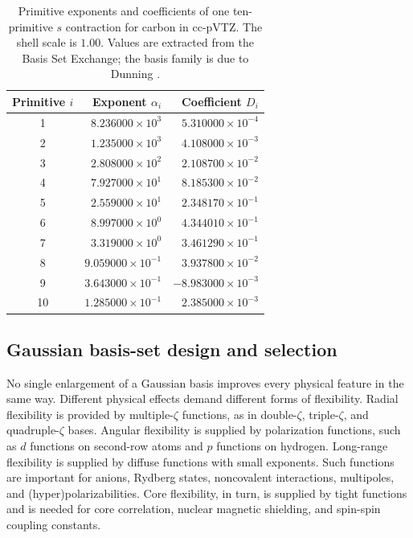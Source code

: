 \documentclass[11pt,a4paper,titlepage]{article}
\newcommand{\hftablestyle}{\small\renewcommand{\arraystretch}{1.00}}
\newcommand{\hftablehead}[1]{\textcolor{hfGreenDark}{\bfseries\boldmath #1}}
\numberwithin{equation}{section}
\begin{document}
\begin{table}[htbp]
  \centering
  \hftablestyle
  \caption{Primitive exponents and coefficients of one ten-primitive $s$
  contraction for carbon in cc-pVTZ. The shell scale is $1.00$. Values are
  extracted from the Basis Set Exchange; the basis family is due to Dunning
  \citep{Dunning1989,Pritchard2019}.}
  \label{tab:carbon-contraction}

\begin{tabular}{@{}crr@{}}
\toprule
\hftablehead{Primitive $i$} & \hftablehead{Exponent $\alpha_i$} &
\hftablehead{Coefficient $D_i$}\\
\midrule
1  & $8.236000\times10^{3}$  & $5.310000\times10^{-4}$\\
2  & $1.235000\times10^{3}$  & $4.108000\times10^{-3}$\\
3  & $2.808000\times10^{2}$  & $2.108700\times10^{-2}$\\
4  & $7.927000\times10^{1}$  & $8.185300\times10^{-2}$\\
5  & $2.559000\times10^{1}$  & $2.348170\times10^{-1}$\\
6  & $8.997000\times10^{0}$  & $4.344010\times10^{-1}$\\
7  & $3.319000\times10^{0}$  & $3.461290\times10^{-1}$\\
8  & $9.059000\times10^{-1}$ & $3.937800\times10^{-2}$\\
9  & $3.643000\times10^{-1}$ & $-8.983000\times10^{-3}$\\
10 & $1.285000\times10^{-1}$ & $2.385000\times10^{-3}$\\
\bottomrule
\end{tabular}


\end{table}


\subsection{Gaussian basis-set design and selection}

No single enlargement of a Gaussian basis improves every physical feature in
the same way. Different physical effects demand different forms of
flexibility.
Radial flexibility is provided by multiple-$\zeta$ functions, as in
double-$\zeta$, triple-$\zeta$, and quadruple-$\zeta$ bases.
Angular flexibility is supplied by polarization functions, such as
$d$ functions on second-row atoms and $p$ functions on hydrogen.
Long-range flexibility is supplied by diffuse functions with small
exponents. Such functions are important for anions, Rydberg states,
noncovalent interactions, multipoles, and (hyper)polarizabilities.
Core flexibility, in turn, is supplied by tight functions and is
needed for core correlation, nuclear magnetic shielding, and spin-spin
coupling constants.
\end{document}
